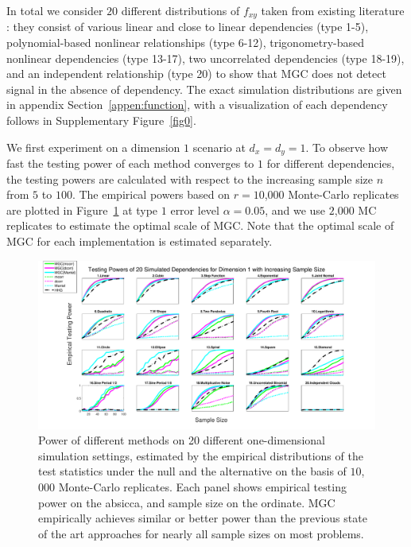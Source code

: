 \documentclass[11pt]{article}
\begin{document}

In total we consider $20$ different distributions of $f_{xy}$ taken from existing literature \cite{SzekelyRizzoBakirov2007, SimonTibshirani2012, GorfineHellerHeller2012, HellerGorfine2013}: they consist of various linear and close to linear dependencies (type 1-5), polynomial-based nonlinear relationships (type 6-12), trigonometry-based nonlinear dependencies (type 13-17), two uncorrelated dependencies (type 18-19), and an independent relationship (type 20) to show that MGC does not detect signal in the absence of dependency. The exact simulation distributions are given in appendix Section~\ref{appen:function}, with a visualization of each dependency follows in Supplementary Figure~\ref{fig0}.

We first experiment on a dimension $1$ scenario at $d_{x}=d_{y}=1$. To observe how fast the testing power of each method converges to $1$ for different dependencies, the testing powers are calculated with respect to the increasing sample size $n$ from $5$ to $100$. The empirical powers based on $r=10$,$000$ Monte-Carlo replicates are plotted in Figure~\ref{fig:1D} at type $1$ error level $\alpha=0.05$, and we use $2$,$000$ MC replicates to estimate the optimal scale of MGC. Note that the optimal scale of MGC for each implementation is estimated separately. 

\begin{figure}[htbp]
\includegraphics[width=1.0\textwidth]{../Figures/Fig1}
\caption{
Power of different methods on 20 different one-dimensional simulation settings, estimated by the empirical distributions of the test statistics under the null and the alternative on the basis of $10$,$000$ Monte-Carlo replicates.
Each panel shows empirical testing power on the absicca, and sample size on the ordinate.
MGC empirically achieves similar or better power than the previous state of the art approaches for nearly all sample sizes on most problems.}
\label{fig:1D}
\end{figure}
\end{document}
